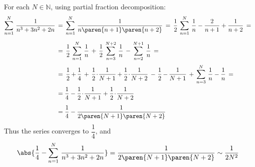 For each $N \in \mathbb{N}$, using partial fraction decomposition:
\begin{equation*}
\begin{split}
  \sum\limits_{n=1}^{N} {\, \frac{1}{n^3 + 3 n^2 + 2n}} \,
  &= \, \sum\limits_{n=1}^{N} {\, \frac{1}{n \paren{n + 1} \paren{n + 2}}} \,
   = \, \frac{1}{2} \, \sum\limits_{n=1}^{N} {\, \frac{1}{n} - \frac{2}{n + 1} + \frac{1}{n + 2}} \, = \\[1.35ex]
  &= \, \frac{1}{2} \, \sum\limits_{n=1}^{N} {\, \frac{1}{n}}
     \, + \, \frac{1}{2} \, \sum\limits_{n=3}^{N + 2} {\, \frac{1}{n}}
     \, - \, \sum\limits_{n=2}^{N + 1} {\, \frac{1}{n}} \, = \\[0.6ex]
  &= \, \frac{1}{2} \mspace{-1.2mu} + \mspace{-1.2mu} \frac{1}{4}
     \, + \, \frac{1}{2} \! \cdot \! \frac{1}{N + 1} \mspace{-0.6mu}
     + \mspace{-0.6mu} \frac{1}{2} \! \cdot \! \frac{1}{N + 2}
     \, - \mspace{1.5mu} \frac{1}{2} \mspace{-1.2mu} - \mspace{-1.2mu} \frac{1}{N + 1}
     \, + \, \sum\limits_{n=3}^{N} {\, \frac{1}{n} - \frac{1}{n}} \, = \\[0.3ex]
  &= \frac{1}{4}
     - \frac{1}{2} \! \cdot \! \frac{1}{N + 1}
     + \frac{1}{2} \! \cdot \! \frac{1}{N + 2} \\[1.1ex]
  &= \frac{1}{4} - \frac{1}{2 \paren{N + 1} \paren{N + 2}}
\end{split}
\end{equation*}
Thus the series converges to $\dfrac{1}{4}$, and
\begin{equation*}
  \abs{\frac{1}{4} - \sum\limits_{n=1}^{N} {\, \frac{1}{n^3 + 3 n^2 + 2n}}}
  = \frac{1}{2 \paren{N + 1} \paren{N + 2}}
  \sim \frac{1}{2 N^2}
\end{equation*}
